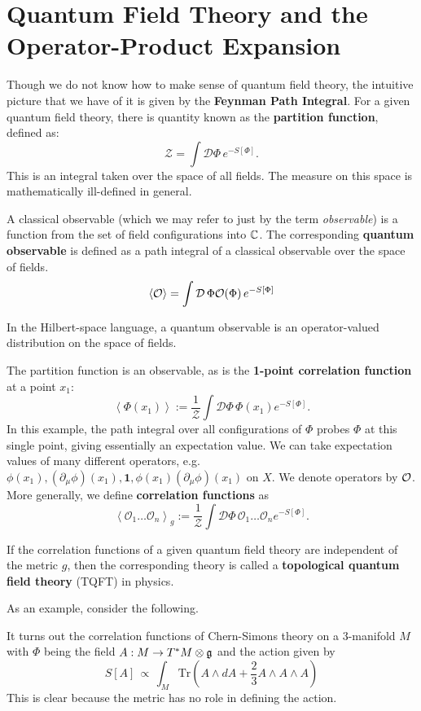 	\section{Quantum Field Theory and the Operator-Product Expansion} %
	\label{sec:quantum_field_theory_and_the_operator_product_expansion}
	
		Though we do not know how to make sense of quantum field theory, the intuitive picture that we have of it is given by the \textbf{Feynman Path Integral}. For a given quantum field theory, there is quantity known as the \textbf{partition function}, defined as:
		\begin{equation}
			\mathcal Z = \int \mathcal D\Phi\, e^{- S[\Phi]}.
		\end{equation}
		This is an integral taken over the space of all fields. The measure on this space is mathematically ill-defined in general. 
		\begin{phys}
			A classical observable (which we may refer to just by the term \emph{observable}) is a function from the set of field configurations into $\mathbb{C}$. The corresponding \textbf{quantum observable} is defined as a path integral of a classical observable over the space of fields. 
			\[
				\left< \mathcal{O} \right> = \int \mathcal D \, \Phi \mathcal{O}(\Phi) \, e^{-S[\Phi]}
			\]
			
			In the Hilbert-space language, a quantum observable is an operator-valued distribution on the space of fields. 
		\end{phys}
		The partition function is an observable, as is the \textbf{1-point correlation function} at a point $x_1$:
		$$\left< \Phi(x_1) \right> := \frac{1}{\mathcal Z} \int \mathcal D\Phi \, \Phi(x_1) e^{-S[\Phi]}.$$
		In this example, the path integral over all configurations of $\Phi$ probes $\Phi$ at this single point, giving essentially an expectation value. We can take expectation values of many different operators, e.g. $\phi(x_1), (\partial_\mu \phi)(x_1), \mathbf{1}, \phi(x_1) (\partial_\mu \phi)(x_1)$ on $X$. We denote operators by $\mathcal{O}$. More generally, we define \textbf{correlation functions} as 
		$$\left< \mathcal O_1 \dots \mathcal O_n \right>_g := \frac{1}{\mathcal Z} \int \mathcal D\Phi \, \mathcal O_1 \dots \mathcal O_n e^{-S[\Phi]}.$$
		\begin{phys}[TQFT]
			If the correlation functions of a given quantum field theory are independent of the metric $g$, then the corresponding theory is called a \textbf{topological quantum field theory} (TQFT) in physics.
		\end{phys}
		As an example, consider the following.
		\begin{eg}
			It turns out the correlation functions of Chern-Simons theory on a 3-manifold $M$ with $\Phi$ being the field $A: M \to T^* M \otimes \frak g$ and the action given by
			$$S[A] \, \propto\,  \int_{M} \mathrm{Tr}\left(A \wedge dA + \frac23 A \wedge A \wedge A \right)$$
			This is clear because the metric has no role in defining the action.
		\end{eg}

